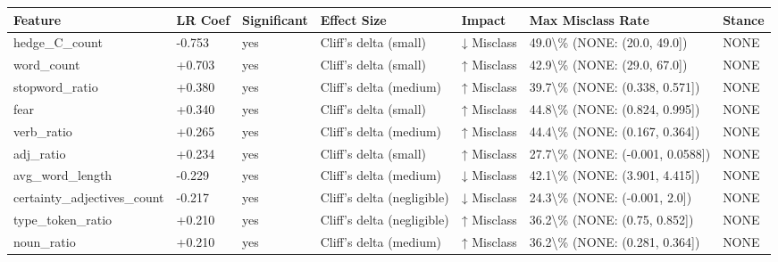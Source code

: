 \begin{tabular}{lllllll}
\toprule
Feature & LR Coef & Significant & Effect Size & Impact & Max Misclass Rate & Stance \\
\midrule
hedge\_C\_count & -0.753 & yes & Cliff's delta (small) & ↓ Misclass & 49.0\textbackslash \% (NONE: (20.0, 49.0]) & NONE \\
word\_count & +0.703 & yes & Cliff's delta (small) & ↑ Misclass & 42.9\textbackslash \% (NONE: (29.0, 67.0]) & NONE \\
stopword\_ratio & +0.380 & yes & Cliff's delta (medium) & ↑ Misclass & 39.7\textbackslash \% (NONE: (0.338, 0.571]) & NONE \\
fear & +0.340 & yes & Cliff's delta (small) & ↑ Misclass & 44.8\textbackslash \% (NONE: (0.824, 0.995]) & NONE \\
verb\_ratio & +0.265 & yes & Cliff's delta (medium) & ↑ Misclass & 44.4\textbackslash \% (NONE: (0.167, 0.364]) & NONE \\
adj\_ratio & +0.234 & yes & Cliff's delta (small) & ↑ Misclass & 27.7\textbackslash \% (NONE: (-0.001, 0.0588]) & NONE \\
avg\_word\_length & -0.229 & yes & Cliff's delta (medium) & ↓ Misclass & 42.1\textbackslash \% (NONE: (3.901, 4.415]) & NONE \\
certainty\_adjectives\_count & -0.217 & yes & Cliff's delta (negligible) & ↓ Misclass & 24.3\textbackslash \% (NONE: (-0.001, 2.0]) & NONE \\
type\_token\_ratio & +0.210 & yes & Cliff's delta (negligible) & ↑ Misclass & 36.2\textbackslash \% (NONE: (0.75, 0.852]) & NONE \\
noun\_ratio & +0.210 & yes & Cliff's delta (medium) & ↑ Misclass & 36.2\textbackslash \% (NONE: (0.281, 0.364]) & NONE \\
\bottomrule
\end{tabular}
